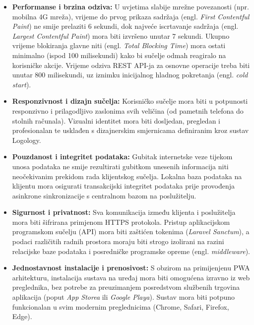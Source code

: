 \documentclass[a4paper,12pt,oneside]{article}
\begin{document}
	\begin{itemize}
		\item \textbf{Performanse i brzina odziva:} U uvjetima slabije mrežne povezanosti (npr. mobilna 4G mreža), vrijeme do prvog prikaza sadržaja (engl. \textit{First Contentful Paint}) ne smije prelaziti 6 sekundi, dok najveće iscrtavanje sadržaja (engl. \textit{Largest Contentful Paint}) mora biti izvršeno unutar 7 sekundi. Ukupno vrijeme blokiranja glavne niti (engl. \textit{Total Blocking Time}) mora ostati minimalno (ispod 100 milisekundi) kako bi sučelje odmah reagiralo na korisničke akcije. Vrijeme odziva REST API-ja za osnovne operacije treba biti unutar 800 milisekundi, uz iznimku inicijalnog hladnog pokretanja (engl. \textit{cold start}).
		
		\item \textbf{Responzivnost i dizajn sučelja:} Korisničko sučelje mora biti u potpunosti responzivno i prilagodljivo zaslonima svih veličina (od pametnih telefona do stolnih računala). Vizualni identitet mora biti dosljedan, pregledan i profesionalan te usklađen s dizajnerskim smjernicama definiranim kroz sustav Logology.
		
		\item \textbf{Pouzdanost i integritet podataka:} Gubitak internetske veze tijekom unosa podataka ne smije rezultirati gubitkom unesenih informacija niti neočekivanim prekidom rada klijentskog sučelja. Lokalna baza podataka na klijentu mora osigurati transakcijski integritet podataka prije provođenja asinkrone sinkronizacije s centralnom bazom na poslužitelju.
		
		\item \textbf{Sigurnost i privatnost:} Sva komunikacija između klijenta i poslužitelja mora biti šifrirana primjenom HTTPS protokola. Pristup aplikacijskom programskom sučelju (API) mora biti zaštićen tokenima (\textit{Laravel Sanctum}), a podaci različitih radnih prostora moraju biti strogo izolirani na razini relacijske baze podataka i posredničke programske opreme (engl. \textit{middleware}).
		
		\item \textbf{Jednostavnost instalacije i prenosivost:} S obzirom na primijenjenu PWA arhitekturu, instalacija sustava na uređaj mora biti omogućena izravno iz web preglednika, bez potrebe za preuzimanjem posredstvom službenih trgovina aplikacija (poput \textit{App Storea} ili \textit{Google Playa}). Sustav mora biti potpuno funkcionalan u svim modernim preglednicima (Chrome, Safari, Firefox, Edge).
	\end{itemize}
	
\end{document}
